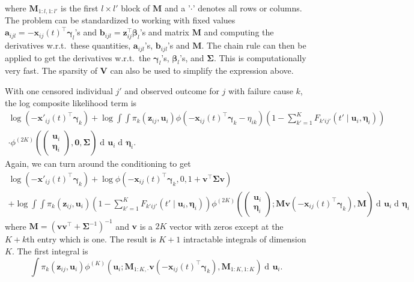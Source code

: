 \documentclass{article}
\newcommand\mat[1]{\mathbf{#1}}
\renewcommand\vec{\bm}
\newcommand\der{\operatorname{d\!}{}}
\begin{document}
%
where $\mat M_{1:l,1:l'}$ is the first $l\times l'$ block of 
$\mat M$ and a '$\cdot$' denotes all rows or columns. 
The problem can be standardized to working with 
fixed values $\vec a_{ijl} = -\vec x_{ij}(t)^\top\vec\gamma_l$'s and 
$\vec b_{ijl} = \vec z_{ij}^\top\vec\beta_l$'s
and matrix $\mat M$ and computing the derivatives w.r.t.\ these quantities,
$\vec a_{ijl}$'s, $\vec b_{ijl}$'s and $\mat M$. 
The chain rule can then be applied to get the derivatives w.r.t.\ 
the $\vec\gamma_l$'s, $\vec\beta_l$'s, and $\mat\Sigma$. This is  
computationally very fast. The sparsity of $\mat V$ can also be used to 
simplify the expression above.

With one censored individual $j'$ and observed outcome for $j$ with 
failure cause $k$, the log 
composite likelihood term is %
%
\begin{multline*}
\log(-\vec x'_{ij}(t)^\top\vec\gamma_k) + \log \int\int 
  \pi_k(\vec z_{ij},\vec u_i)\phi(-\vec x_{ij}(t)^\top\vec\gamma_k - \eta_{ik})
  \left(1 - \sum_{k' = 1}^K F_{k'ij'}(t'\mid \vec u_i, \vec\eta_i)\right) \\
\cdot\phi^{(2K)}\left(
      \begin{pmatrix}
        \vec u_i \\ \vec\eta_i
      \end{pmatrix}, \vec 0,\mat \Sigma\right)
  \der \vec u_i\der \vec\eta_i.
\end{multline*}%
%
Again, we can turn around the conditioning to get %
%
\begin{multline*}
\log(-\vec x'_{ij}(t)^\top\vec\gamma_k)  
  + \log \phi\left(
    -\vec x_{ij}(t)^\top\vec\gamma_k, 0, 1 + \vec v^\top\mat\Sigma\vec v\right) \\
+ \log \int\int 
  \pi_k(\vec z_{ij},\vec u_i)
  \left(1 - \sum_{k' = 1}^K F_{k'ij'}(t'\mid \vec u_i, \vec\eta_i)\right)
  \phi^{(2K)}\left(
    \begin{pmatrix}\vec u_i \\ \vec\eta_i \end{pmatrix}; 
    \mat M\vec v(-\vec x_{ij}(t)^\top\vec\gamma_k),
    \mat M
    \right)
  \der \vec u_i\der \vec\eta_i
\end{multline*}%
%
where $\mat M = (\vec v\vec v^\top + \mat\Sigma^{-1})^{-1}$ and $\vec v$ is 
a $2K$ vector with zeros except at the $K + k$th entry which is one. 
The result is $K + 1$ intractable integrals of dimension $K$. The first 
integral is %
%
$$
\int \pi_k(\vec z_{ij},\vec u_i)\phi^{(K)}\left(
    \vec u_i; 
    \mat M_{1:K,\cdot}\vec v(-\vec x_{ij}(t)^\top\vec\gamma_k),
    \mat M_{1:K,1:K}
    \right)\der\vec u_i.
$$%
\end{document}
